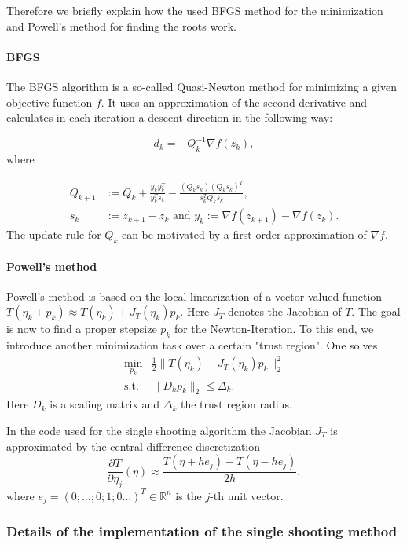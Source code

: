 \documentclass[a4paper]{article}
\theoremstyle{definitions}
\theoremstyle{bemerkung}
\theoremstyle{satz}
\theoremstyle{satz}
\begin{document}
Therefore we briefly explain how the used BFGS method for the minimization and Powell's method for finding the roots work.

\paragraph{BFGS}

The BFGS algorithm is a so-called Quasi-Newton method for minimizing a given objective function $f$. It uses an approximation of the second derivative and calculates in each iteration a descent direction in the following way:

\[
    d_k = -Q_k^{-1}\nabla f(z_k),
\]
where

\begin{align*}
    Q_{k+1} &:= Q_k + \frac{y_k y_k^T}{y_k^T s_k}-\frac{(Q_k s_k)(Q_k s_k)^T}{s_k^T Q_k s_k},\\
    s_k &:=  z_{k+1}-z_k \text{ and } y_k := \nabla f(z_{k+1})-\nabla f(z_k).
\end{align*}
The update rule for $Q_k$ can be motivated by a first order approximation of $\nabla f$.

\paragraph{Powell's method}

Powell's method is based on the local linearization of a vector valued function $T(\eta_k + p_k) \approx T(\eta_k) + J_T (\eta_k)p_k $. Here $J_T$ denotes the Jacobian of $T$. The goal is now to find a proper stepsize $p_k$ for the Newton-Iteration. To this end, we introduce another minimization task over a certain "trust region". One solves 
\begin{align*}
    \min_{p_k} &\frac{1}{2}\|T(\eta_k)+J_T(\eta_k)p_k\|_2^2\\
    \text{s.t. }& \|D_k p_k\|_2 \leq \Delta_k. 
\end{align*} 
Here $D_k$ is a scaling matrix and $\Delta_k$ the trust region radius.

In the code used for the single shooting algorithm the Jacobian $J_T$ is approximated by the central difference discretization
\[
    \frac{\partial T}{\partial\eta_j}(\eta) \approx \frac{T(\eta+h e_j)-T(\eta-he_j)}{2h},
\]
where $e_j = (0; \dots;0;1;0\dots)^T \in \mathbb{R}^n$ is the $j$-th unit vector.


\subsubsection{Details of the implementation of the single shooting method}
\end{document}
